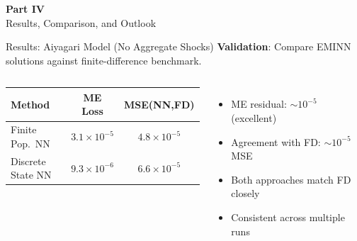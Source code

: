 \documentclass[aspectratio=169,11pt]{beamer}
\begin{document}
\begin{frame}{}
\vfill
\begin{center}
{\Huge \textcolor{uzhblue}{\textbf{Part IV}}}\\[12pt]
{\LARGE Results, Comparison, and Outlook}
\end{center}
\vfill
\end{frame}

\begin{frame}[shrink=2]{Results: Aiyagari Model (No Aggregate Shocks)}
\small
\textbf{Validation}: Compare EMINN solutions against finite-difference benchmark.

\vspace{0.1em}
\begin{columns}[T]
\begin{center}
\footnotesize
\renewcommand{\arraystretch}{1.1}
\begin{tabular}{lcc}
\toprule
\textbf{Method} & \textbf{ME Loss} & \textbf{MSE(NN,FD)} \\
\midrule
Finite Pop.\ NN & $3.1 \times 10^{-5}$ & $4.8 \times 10^{-5}$ \\
Discrete State NN & $9.3 \times 10^{-6}$ & $6.6 \times 10^{-5}$ \\
\bottomrule
\end{tabular}
\end{center}

\vspace{0.1em}
\begin{itemize}\itemsep0pt
    \item ME residual: $\sim 10^{-5}$ (excellent)
    \item Agreement with FD: $\sim 10^{-5}$ MSE
    \item Both approaches match FD closely
    \item Consistent across multiple runs
\end{itemize}


\end{columns}
\end{frame}
\end{document}
